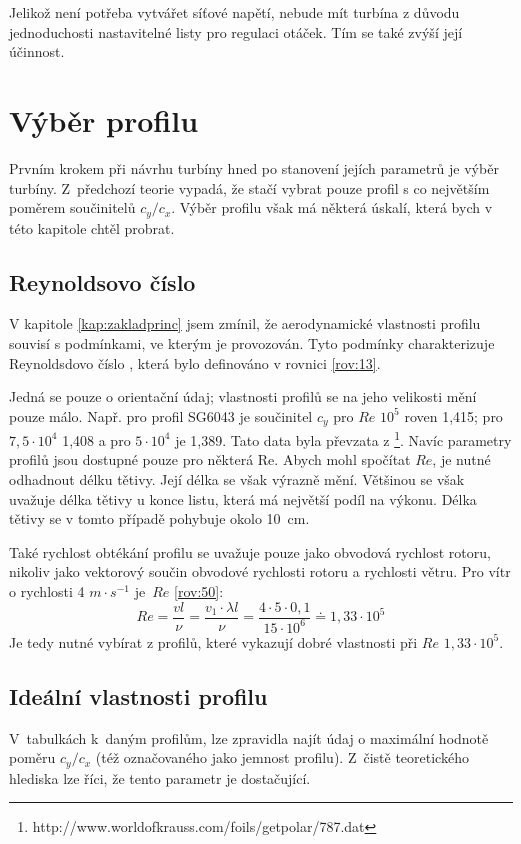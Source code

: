 Jelikož není potřeba vytvářet síťové napětí, nebude mít turbína z důvodu jednoduchosti nastavitelné listy pro regulaci otáček. Tím se také zvýší její účinnost.

\section{Výběr profilu}
Prvním krokem při návrhu turbíny hned po stanovení jejích parametrů je výběr turbíny. Z~předchozí teorie vypadá, že stačí vybrat pouze profil s co největším poměrem součinitelů $c_y/c_x$. Výběr profilu však má některá úskalí, která bych v této kapitole chtěl probrat.

\subsection{Reynoldsovo číslo}
V kapitole \ref{kap:zakladprinc} jsem zmínil, že aerodynamické vlastnosti profilu souvisí s podmínkami, ve kterým je provozován. Tyto podmínky charakterizuje Reynoldsdovo číslo \cite{Rychetnik:Motory}, která bylo definováno v rovnici \eqref{rov:13}.

Jedná se pouze o orientační údaj; vlastnosti profilů se na jeho velikosti mění pouze málo. Např. pro profil SG6043 je součinitel $c_y$ pro $Re$ $10^5$ roven 1,415; pro $7,5\cdot 10^4$ 1,408 a pro $5\cdot 10^4$ je 1,389. Tato data byla převzata z \cite{profil}\footnote{http://www.worldofkrauss.com/foils/getpolar/787.dat}. Navíc parametry profilů jsou dostupné pouze pro některá Re.
Abych mohl spočítat $Re$, je nutné odhadnout délku tětivy. Její délka se však výrazně mění. Většinou se však uvažuje délka tětivy u konce listu, která má největší podíl na výkonu. Délka tětivy se v tomto případě pohybuje okolo 10~cm.

Také rychlost obtékání profilu se uvažuje pouze jako obvodová rychlost rotoru, nikoliv jako vektorový součin obvodové rychlosti rotoru a rychlosti větru. Pro vítr o rychlosti 4 $m\cdot s^{-1}$ je~$Re$ \eqref{rov:50}:
\begin{equation}
	\label{rov:50}
	Re=\frac{vl}{\nu}=\frac{v_1\cdot\lambda l}{\nu}=\frac{4\cdot 5 \cdot 0,1}{15\cdot 10^6}\doteq 1,33\cdot 10^5
	\end{equation}
Je tedy nutné vybírat z profilů, které vykazují dobré vlastnosti při $Re$ $1,33\cdot 10^5$.

\subsection{Ideální vlastnosti profilu}
V~tabulkách k~daným profilům, lze zpravidla najít údaj o maximální hodnotě poměru $c_y/c_x$ (též označovaného jako jemnost profilu). Z~čistě teoretického hlediska lze říci, že tento parametr je dostačující.

